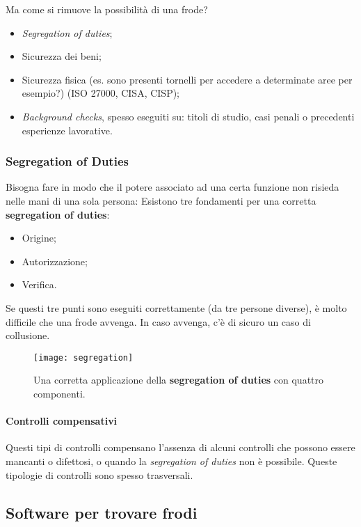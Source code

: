 Ma come si rimuove la possibilità di una frode?
\begin{itemize}
  \item \textit{Segregation of duties};
  \item Sicurezza dei beni;
  \item Sicurezza fisica (es. sono presenti tornelli per accedere a determinate
aree per esempio?) (ISO 27000, CISA, CISP);
  \item \textit{Background checks}, spesso eseguiti su: titoli di studio, 
  casi penali o precedenti esperienze lavorative.
\end{itemize}

\subsubsection{Segregation of Duties}

Bisogna fare in modo che il potere associato ad una certa funzione non risieda
nelle mani di una sola persona:
Esistono tre fondamenti per una corretta \textbf{segregation of duties}:
\begin{itemize}
  \item Origine;
  \item Autorizzazione;
  \item Verifica.
\end{itemize}

Se questi tre punti sono eseguiti correttamente (da tre persone diverse), 
è molto difficile che una frode avvenga. 
In caso avvenga, c'è di sicuro un caso di collusione.

\begin{figure}[H]
 \centering
 \texttt{[image: segregation]}
 \caption{Una corretta applicazione della \textbf{segregation of duties} con 
quattro componenti.}
\end{figure}


\paragraph*{Controlli compensativi}

Questi tipi di controlli compensano l'assenza di alcuni controlli che possono
essere mancanti o difettosi, o quando la \textit{segregation of duties} non è
possibile. Queste tipologie di controlli sono spesso trasversali.

\subsection{Software per trovare frodi}

